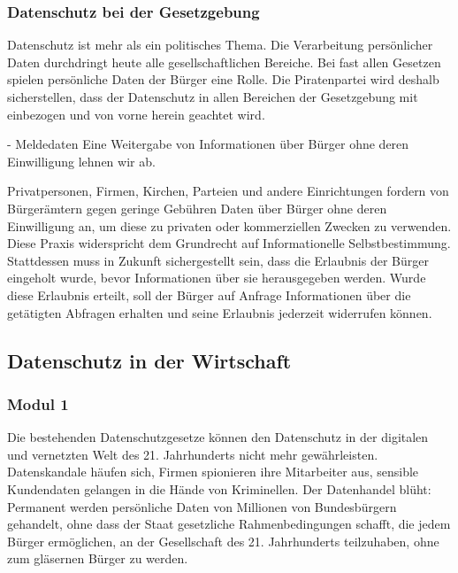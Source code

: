 \subsubsection{Datenschutz bei der Gesetzgebung}
\abstimmung
Datenschutz ist mehr als ein politisches Thema. Die Verarbeitung persönlicher Daten durchdringt heute alle gesellschaftlichen Bereiche. Bei fast allen Gesetzen spielen persönliche Daten der Bürger eine Rolle. Die Piratenpartei wird deshalb sicherstellen, dass der Datenschutz in allen Bereichen der Gesetzgebung mit einbezogen und von vorne herein geachtet wird.
 
\newpage
{}\label{sec:datenschutz:weitergabe}
 - Meldedaten 
\abstimmung
Eine Weitergabe von Informationen über Bürger ohne deren Einwilligung lehnen wir ab.

Privatpersonen, Firmen, Kirchen, Parteien und andere Einrichtungen fordern von Bürgerämtern gegen geringe Gebühren Daten über Bürger ohne deren Einwilligung an, um diese zu privaten oder kommerziellen Zwecken zu verwenden. Diese Praxis widerspricht dem Grundrecht auf Informationelle Selbstbestimmung. Stattdessen muss in Zukunft sichergestellt sein, dass die Erlaubnis der Bürger eingeholt wurde, bevor Informationen über sie herausgegeben werden. Wurde diese Erlaubnis erteilt, soll der Bürger auf Anfrage Informationen über die getätigten Abfragen erhalten und seine Erlaubnis jederzeit widerrufen können.

\subsection*{Datenschutz in der Wirtschaft}
\abstimmung
\subsubsection{Modul 1}
Die bestehenden Datenschutzgesetze können den Datenschutz in der digitalen und vernetzten Welt des 21. Jahrhunderts nicht mehr gewährleisten. Datenskandale häufen sich, Firmen spionieren ihre Mitarbeiter aus, sensible Kundendaten gelangen in die Hände von Kriminellen. Der Datenhandel blüht: Permanent werden persönliche Daten von Millionen von Bundesbürgern gehandelt, ohne dass der Staat gesetzliche Rahmenbedingungen schafft, die jedem Bürger ermöglichen, an der Gesellschaft des 21. Jahrhunderts teilzuhaben, ohne zum gläsernen Bürger zu werden.
 
